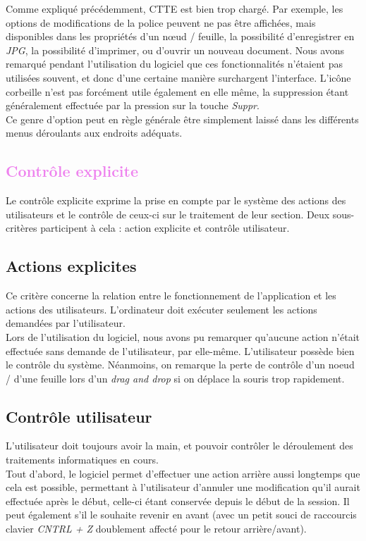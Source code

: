 \documentclass[12pt, a4paper]{article}
\begin{document}
Comme expliqué précédemment, CTTE est bien trop chargé. Par exemple, les options de modifications de la police peuvent ne pas être affichées, mais disponibles dans les propriétés d'un nœud / feuille, la possibilité d'enregistrer en \emph{JPG}, la possibilité d'imprimer, ou d'ouvrir un nouveau document. Nous avons remarqué pendant l'utilisation du logiciel que ces fonctionnalités n'étaient pas utilisées souvent, et donc d'une certaine manière surchargent l'interface. L'icône corbeille n'est pas forcément utile également en elle même, la suppression étant généralement effectuée par la pression sur la touche \emph{Suppr}. \\


Ce genre d'option peut en règle générale être simplement laissé dans les différents menus déroulants aux endroits adéquats.

\textcolor{Violet}{\section{Contrôle explicite}}
Le contrôle explicite exprime la prise en compte par le système des actions des utilisateurs et le contrôle de ceux-ci sur le traitement de leur section. Deux sous-critères participent à cela : action explicite et contrôle utilisateur.
\textcolor{NavyBlue}{\subsection{Actions explicites}}
Ce critère concerne la relation entre le fonctionnement de l'application et les actions des utilisateurs. L'ordinateur doit exécuter seulement les actions demandées par l'utilisateur.\\


Lors de l'utilisation du logiciel, nous avons pu remarquer qu'aucune action n'était effectuée sans demande de l'utilisateur, par elle-même. L'utilisateur possède bien le contrôle du système. Néanmoins, on remarque la perte de contrôle d'un noeud / d'une feuille lors d'un \emph{drag and drop} si on déplace la souris trop rapidement.

\textcolor{NavyBlue}{\subsection{Contrôle utilisateur}}
L'utilisateur doit toujours avoir la main, et pouvoir contrôler le déroulement des traitements informatiques en cours. \\


Tout d'abord, le logiciel permet d'effectuer une action arrière aussi longtemps que cela est possible, permettant à l'utilisateur d'annuler une modification qu'il aurait effectuée après le début, celle-ci étant conservée depuis le début de la session. Il peut également s'il le souhaite revenir en avant (avec un petit souci de raccourcis clavier \emph{CNTRL + Z} doublement affecté pour le retour arrière/avant).
\end{document}

